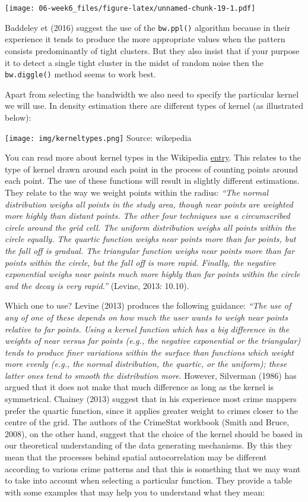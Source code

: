 \documentclass[]{book}
\begin{document}
\texttt{[image: 06-week6\_files/figure-latex/unnamed-chunk-19-1.pdf]}

Baddeley et (2016) suggest the use of the \texttt{bw.ppl()} algorithm because in their experience it tends to produce the more appropriate values when the pattern consists predominantly of tight clusters. But they also insist that if your purpose it to detect a single tight cluster in the midst of random noise then the \texttt{bw.diggle()} method seems to work best.

Apart from selecting the bandwidth we also need to specify the particular kernel we will use. In density estimation there are different types of kernel (as illustrated below):

\texttt{[image: img/kerneltypes.png]}
Source: wikepedia

You can read more about kernel types in the Wikipedia \href{https://en.wikipedia.org/wiki/Kernel_(statistics)}{entry}. This relates to the type of kernel drawn around each point in the process of counting points around each point. The use of these functions will result in slightly different estimations. They relate to the way we weight points within the radius: \emph{``The normal distribution weighs all points in the study area, though near points are weighted more highly than distant points. The other four techniques use a circumscribed circle around the grid cell. The uniform distribution weighs all points within the circle equally. The quartic function weighs near points more than far points, but the fall off is gradual. The triangular function weighs near points more than far points within the circle, but the fall off is more rapid. Finally, the negative exponential weighs near points much more highly than far points within the circle and the decay is very rapid.''} (Levine, 2013: 10.10).

Which one to use? Levine (2013) produces the following guidance: \emph{``The use of any of one of these depends on how much the user wants to weigh near points relative to far points. Using a kernel function which has a big difference in the weights of near versus far points (e.g., the negative exponential or the triangular) tends to produce finer variations within the surface than functions which weight more evenly (e.g., the normal distribution, the quartic, or the uniform); these latter ones tend to smooth the distribution more}. However, Silverman (1986) has argued that it does not make that much difference as long as the kernel is symmetrical. Chainey (2013) suggest that in his experience most crime mappers prefer the quartic function, since it applies greater weight to crimes closer to the centre of the grid. The authors of the CrimeStat workbook (Smith and Bruce, 2008), on the other hand, suggest that the choice of the kernel should be based in our theoretical understanding of the data generating mechanisms. By this they mean that the processes behind spatial autocorrelation may be different according to various crime patterns and that this is something that we may want to take into account when selecting a particular function. They provide a table with some examples that may help you to understand what they mean:
\end{document}
